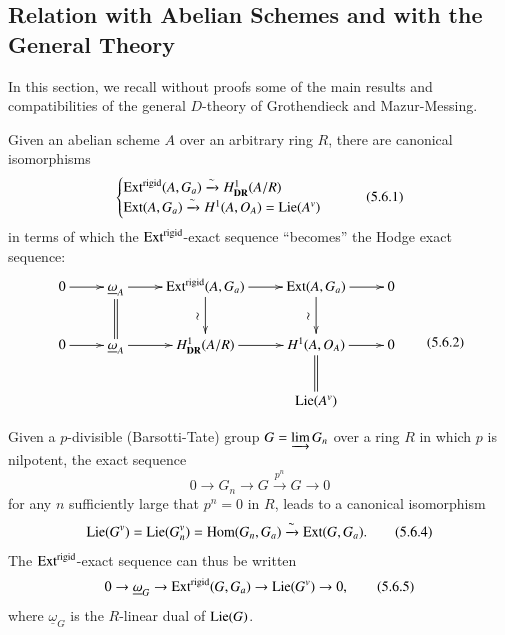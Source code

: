 \subsection{Relation with Abelian Schemes and with the General Theory}\label{art6-sec5.6}\pageoriginale
In this section, we recall without proofs some of the main results and compatibilities of the general $D$-theory of Grothendieck and Mazur-Messing.

Given an abelian scheme $A$ over an arbitrary ring $R$, there are canonical isomorphisms
\begin{equation*}
\begin{cases}
\operatorname{Ext}^{\text{rigid}}(A,G_{a})\xrightarrow{\sim}H^{1}_{\mathbf{DR}}(A/R)\\
\operatorname{Ext}(A,G_{a})\xrightarrow{\sim}H^{1}(A,O_{A})=\operatorname{Lie}(A^{v})
\end{cases}\tag{5.6.1}\label{art6-eq5.6.1}
\end{equation*}
in terms of which the $\operatorname{Ext}^{\text{rigid}}$-exact sequence ``becomes'' the Hodge exact sequence:
\begin{equation*}
\vcenter{
\xymatrix{
0\ar[r] & \underline{\omega}_{A}\ar[r]\ar@{=}[d] & \Ext^{\text{rigid}}(A,G_{a})\ar[d]_{\rotatebox{90}{$\sim$}}\ar[r] & \Ext(A,G_{a})\ar[d]_{\rotatebox{90}{$\sim$}}\ar[r] & 0\\
0\ar[r] & \underline{\omega}_{A}\ar[r] & H^{1}_{\DR}(A/R)\ar[r] & H^{1}(A,O_{A})\ar@{=}[d]\ar[r] & 0\\
        &                             &                      & \Lie(A^{v}) &    
}}\tag{5.6.2}\label{art6-eq5.6.2}
\end{equation*}

Given a $p$-divisible (Barsotti-Tate) group $G=\varinjlim G_{n}$ over a ring $R$ in which $p$ is nilpotent, the exact sequence
\begin{equation*}
0\to G_{n}\to G\xrightarrow{p^{n}}G\to 0\tag{5.6.3}\label{art6-eq5.6.3}
\end{equation*}
for any $n$ sufficiently large that $p^{n}=0$ in $R$, leads to a canonical isomorphism
\begin{equation*}
\operatorname{Lie}(G^{v})=\operatorname{Lie}(G^{v}_{n})=\operatorname{Hom}(G_{n},G_{a})\xrightarrow{\sim}\operatorname{Ext}(G,G_{a}).\tag{5.6.4}\label{art6-eq5.6.4}
\end{equation*}
The $\operatorname{Ext}^{\text{rigid}}$-exact sequence can thus be written
\begin{equation*}
0\to \underline{\omega}_{G}\to \operatorname{Ext}^{\text{rigid}}(G,G_{a})\to \operatorname{Lie}(G^{v})\to 0,\tag{5.6.5}\label{art6-eq5.6.5}
\end{equation*}
where $\underline{\omega}_{G}$ is the $R$-linear dual of $\operatorname{Lie} (G)$.

